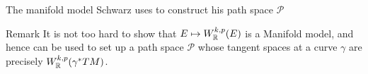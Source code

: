\documentclass{amsart}
\begin{document}
\begin{clear}{The manifold model Schwarz uses to construct his path
    space $\mathscr{P}$}
  
\begin{clear}{Remark}
  It is not too hard to show that $E\mapsto W^{k,p}_{\mathbb{R}}(E)$ is a
  Manifold model, and hence can be used to set up a path space
  $\mathscr{P}$ whose tangent spaces at a curve $\gamma$ are precisely
  $W^{k,p}_{\mathbb{R}}(\gamma^{*}TM)$.
\end{clear}
\end{clear}

\end{document}
